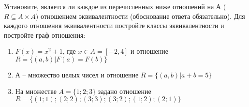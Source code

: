\question
Установите, является ли каждое из перечисленных ниже отношений на А ($R \subseteq A \times A$) отношением эквивалентности (обоснование ответа обязательно). Для каждого отношения эквивалентности постройте классы эквивалентности и постройте граф отношения:
\begin{enumerate}
	\renewcommand{\labelenumi}{\alph{enumi})}
	\item $F(x)=x^{2}+1$, где $x \in A = [-2, 4]$ и отношение $R = \{(a,b)|F(a) = F(b)\}$
	\item А -- множество целых чисел и отношение $R = \{(a,b)|a + b = 5\}$
	\item На множестве $A = \{1; 2; 3\}$ задано отношение $R = \{(1; 1); (2; 2); (3; 3); (3; 2); (1; 2); (2; 1)\}$
\end{enumerate}